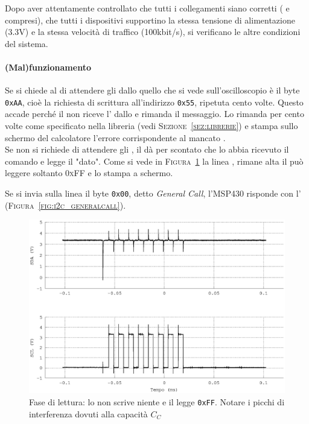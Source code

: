 Dopo aver attentamente controllato che tutti i collegamenti siano corretti
({\sda} e {\scl} compresi),
che tutti i dispositivi supportino la stessa tensione di alimentazione (3.3V)
e la stessa velocità di traffico (100kbit/s),
si verificano le altre condizioni del sistema.\\

\paragraph{(Mal)funzionamento}
Se si chiede al {\master} di attendere gli {\Ack} dallo {\slave}
quello che si vede sull'oscilloscopio è
il byte \texttt{0xAA}, cioè
la richiesta di scrittura all'indirizzo \texttt{0x55},
ripetuta cento volte. Questo accade perché il {\master}
non riceve l'{\ack} dallo {\slave} e rimanda il messaggio.
Lo rimanda per cento volte come specificato nella libreria
(vedi \textsc{Sezione~\ref{sez:librerie}}) e stampa sullo schermo del calcolatore
l'errore corrispondente al mancato {\Ack}.\\

Se non si richiede di attendere gli {\ack},
il \master{} dà per scontato che lo \slave{} abbia ricevuto il comando
e legge il "dato". Come si vede in \textsc{Figura~\ref{fig:i2c_lettura}}
la linea \sda{}, rimane alta il \master{} può leggere soltanto \textsc{0xFF}
e lo stampa a schermo.

Se si invia sulla linea il byte \texttt{0x00}, detto \textit{General Call},
 l'{MSP430} risponde con l'{\ack}
 (\textsc{Figura~\ref{fig:i2c_generalcall}}).

\begin{figure}
\centering
  \includegraphics[width=.5\textwidth]{LetturaNero}
	\caption{Fase di lettura: lo \slave{} non scrive niente e il \master{} legge \texttt{0xFF}. Notare i picchi di interferenza dovuti alla capacità $C_C$}
    \label{fig:i2c_lettura}
\end{figure}

